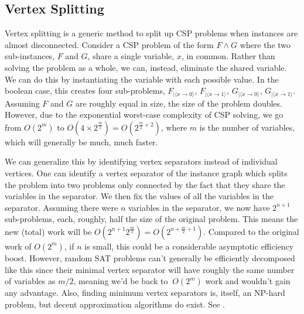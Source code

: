 
\subsection{Vertex Splitting}\label{sec:vertex-splitting}

Vertex splitting is a generic method to split up CSP problems when instances are almost disconnected. Consider a CSP problem of the form $F \wedge G$ where the two sub-instances, $F$ and $G$, share a single variable, $x$, in common. Rather than solving the problem as a whole, we can, instead, eliminate the shared variable. We can do this by instantiating the variable with each possible value. In the boolean case, this creates four sub-problems, $F_{|\langle x \rightarrow 0 \rangle}$, $F_{|\langle x \rightarrow 1 \rangle}$, $G_{|\langle x \rightarrow 0 \rangle}$, $G_{|\langle x \rightarrow 1 \rangle}$. Assuming $F$ and $G$ are roughly equal in size, the size of the problem doubles. However, due to the exponential worst-case complexity of CSP solving, we go from $O(2^m)$ to $O(4 \times 2^{\frac{m}{2}}) = O(2^{\frac{m}{2} + 2})$, where $m$ is the number of variables, which will generally be much, much faster.

We can generalize this by identifying vertex separators instead of individual vertices. One can identify a vertex separator of the instance graph which splits the problem into two problems only connected by the fact that they share the variables in the separator. We then fix the values of all the variables in the separator. Assuming there were $n$ variables in the separator, we now have $2^{n+1}$ sub-problems, each, roughly, half the size of the original problem. This means the new (total) work will be $O(2^{n + 1}  2^{\frac{m}{2}}) = O(2^{n + \frac{m}{2} + 1})$. Compared to the original work of $O(2^m)$, if $n$ is small, this could be a considerable asymptotic efficiency boost. However, random SAT problems can’t generally be efficiently decomposed like this since their minimal vertex separator will have roughly the same number of variables as $m/2$, meaning we’d be back to $~O(2^m)$ work and wouldn’t gain any advantage. Also, finding minimum vertex separators is, itself, an NP-hard problem, but decent approximation algorithms do exist. See \citep{amir2001solving}.

